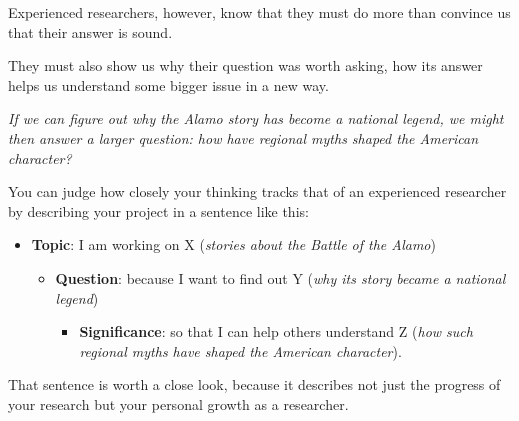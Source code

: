 \documentclass[oneside]{book}
\numberwithin{equation}{section}
\begin{document}
%
Experienced researchers, however, know that they must do more than convince us that their answer is sound.

They must also show us why their question was worth asking, how its answer helps us understand some bigger issue in a new way.

\textit{If we can figure out why the Alamo story has become a national legend, we might then answer a larger question: how have regional myths shaped the American character?}

%
You can judge how closely your thinking tracks that of an experienced researcher by describing your project in a sentence like this:
\begin{itemize}
    \item[1.] \textbf{Topic}: I am working on X (\textit{stories about the Battle of the Alamo})
    \begin{itemize}
        \item[2.] \textbf{Question}: because I want to find out Y (\textit{why its story became a national legend})
        \begin{itemize}
            \item[3.] \textbf{Significance}: so that I can help others understand Z (\textit{how such regional myths have shaped the American character}).
        \end{itemize}
    \end{itemize}
\end{itemize}
That sentence is worth a close look, because it describes not just the progress of your research but your personal growth as a researcher.
\end{document}
